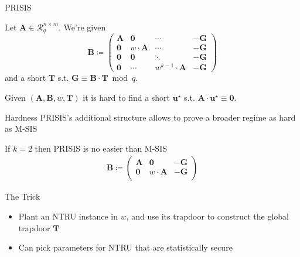 \documentclass[xcolor=table,10pt,aspectratio=169]{beamer}
\renewcommand{\vec}[1]{\ensuremath{\mathbf{#1}}\xspace}
\providecommand{\mat}[1]{\ensuremath{\vec{#1}}\xspace}
\providecommand{\ring}[0]{\ensuremath{\mathcal{R}}\xspace}
\begin{document}
\begin{frame}[label={sec:orgde1b8c6}]{PRISIS}
\begin{definition}[PRISIS]
Let \(\mat{A} \in \ring_{q}^{n \times m}\). We're given
\[\vec{B} \coloneqq \begin{pmatrix}
\mat{A} &               \vec{0} & \cdots & - \vec{G}\\
\vec{0} &           w \cdot \mat{A} & \cdots & -\vec{G}\\
\mat{0} &               \vec{0} & \ddots & -\vec{G}\\
\vec{0} & \cdots & w^{k-1} \cdot \mat{A} & -\vec{G}
\end{pmatrix}\] and a short \(\vec{T}\) s.t. \(\vec{G} \equiv \vec{B} \cdot \vec{T} \bmod q.\)

Given \((\mat{A}, \mat{B}, w, \vec{T})\) it is hard to find a short \(\vec{u}^{\star}\) s.t. \(\mat{A} \cdot \vec{u}^{\star} \equiv \vec{0}\).
\end{definition}

{\footnotesize {} \par}
\end{frame}

\begin{frame}[label={sec:orgd2e5168}]{Hardness}
PRISIS's additional structure allows to prove a broader regime as hard as M-SIS

\begin{alertblock}{If \(k=2\) then PRISIS is no easier than M-SIS}
\begin{align*}
\vec{B} \coloneqq  \begin{pmatrix}
\mat{A} &               \vec{0} & -\vec{G}\\
\vec{0} &           w \cdot \mat{A} & -\vec{G}\\
\end{pmatrix}
\end{align*}
\end{alertblock}

\begin{block}{The Trick}
\begin{itemize}
\item Plant an NTRU instance in \(w\), and use its trapdoor to construct the global trapdoor \(\mat{T}\)
\item Can pick parameters for NTRU that are statistically secure
\end{itemize}
\end{block}
\end{frame}
\end{document}
